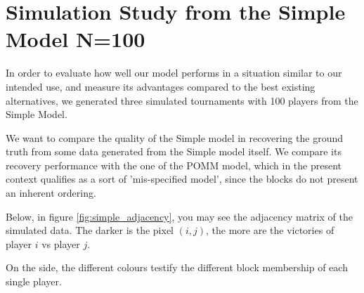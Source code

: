 \documentclass[11pt]{amsart}
\begin{document}
\begin{comment}
\item Prediction error: making prediction on the match score between two players is also possible within this framework. Once we have obtained the MCMC samples, we can retrieve the posterior predictive distribution.

Let us assume $i^\star$ is a new player . The posterior predictive is:
\begin{align}
p(y_{i^\star j}| \textbf{Y}) &= \int p(z| \{ \textbf{Y}\setminus y_{i^\star} \})  \cdot p(y_{i^\star j} | z ) dz \\
&\approx \frac{1}{T} \sum_{t = 1}^{T} \sum_{z_i=1}^{K}  p(y_{i^\star j}| z_j^{(t)}) \\
&=  \frac{1}{T} \sum_{t = 1}^{T} \sum_{z_{i^\star} =1}^{K}  p_{z_{i^\star}, z_j^{(t)}}^{y_{i^\star j} } \cdot (1-p_{z_{i^\star}, z_j^{(t)}})^{n_{i^\star j} -  y_{i^\star j}} \quad \quad \text{for }y_{i^\star j} = 0,\ldots, n_{i^\star j} \\
\end{align} 
where $z_j^{(t)} \sim p(z|Y)$
\end{itemize}
\end{comment}

\clearpage

\section{Simulation Study from the Simple Model N=100}

In order to evaluate how well our model performs in a situation similar to our intended use, and measure its advantages compared to the best existing alternatives, we generated three simulated tournaments with 100 players from the Simple Model. 

We want to compare the quality of the Simple model in recovering the ground truth from some data generated from the Simple model itself. We compare its recovery performance with the one of the POMM model, which in the present context qualifies as a sort of 'mis-specified model', since the blocks do not present an inherent ordering.

Below, in figure \eqref{fig:simple_adjacency}, you may see the adjacency matrix of the simulated data. The darker is the pixel $(i,j)$, the more are the victories of player $i$ vs player $j$.

On the side, the different colours testify the different block membership of each single player.
\end{document}
